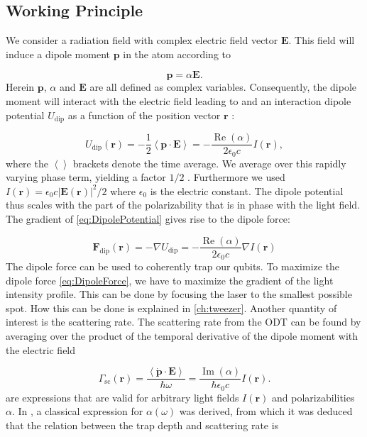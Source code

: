 \subsection{Working Principle}

We consider a radiation field with complex electric field vector $\mathbf{E}$. 
This field will induce a dipole moment $\mathbf{p}$ in the atom according to 
	
\begin{equation}\label{eq:DipoleMoment}
	\mathbf{p} = \alpha \mathbf{E}.
\end{equation}
Herein $\mathbf{p}$, $\alpha$ and $\mathbf{E}$ are all defined as complex variables. Consequently, the dipole moment will interact with the electric field leading to and an interaction dipole potential $U_{\text{dip}}$ as a function of the position vector $\mathbf{r}$ \cite{Grimm2000}:

\begin{equation}\label{eq:DipolePotential}
	U_{\text{dip}}(\mathbf{r}) = 
	-\frac{1}{2} \left\langle \mathbf{p}\cdot\mathbf{E} \right\rangle=
	- \frac{\operatorname{Re}(\alpha)}{2\epsilon_0 c} I(\mathbf{r}),
\end{equation}
where the $\left\langle\right\rangle$ brackets denote the time average.
We average over this rapidly varying phase term, yielding a factor $1/2$ \cite{Grimm2000}.
Furthermore we used $I(\mathbf{r}) = \epsilon_0 c |\mathbf{E}(\mathbf{r})|^2/2$ where $\epsilon_0$ is the electric constant. 
The dipole potential thus scales with the part of the polarizability that is in phase with the light field.
The gradient of \cref{eq:DipolePotential} gives rise to the dipole force:

\begin{equation}\label{eq:DipoleForce}
	\mathbf{F}_{\text{dip}}(\mathbf{r}) 
	= - \nabla U_{\text{dip}}
	= - \frac{\operatorname{Re}(\alpha)}{2\epsilon_0c}\nabla I(\mathbf{r})
\end{equation}
The dipole force can be used to coherently trap our qubits. 
To maximize the dipole force \cref{eq:DipoleForce}, 
we have to maximize the gradient of the light intensity profile.
This can be done by focusing the laser to the smallest possible spot.
How this can be done is explained in \cref{ch:tweezer}. 
Another quantity of interest is the scattering rate.
The scattering rate from the ODT can be found by averaging over the product of the temporal derivative of the dipole moment with the electric field \cite{Grimm2000}

\begin{equation}\label{eq:ScatteringRate}
	\Gamma_{\text{sc}}(\mathbf{r}) = \frac{\left\langle \mathbf{\dot{p}} \cdot \mathbf{E} \right\rangle}{\hbar \omega}
	 = \frac{\operatorname{Im}(\alpha)}{\hbar \epsilon_0 c} I(\mathbf{r}).
\end{equation}
 are expressions that are valid for arbitrary light fields $I(\mathbf{r})$ and polarizabilities $\alpha$.
In \cite{Grimm2000}, a classical expression for $\alpha(\omega)$ was derived, from which it was deduced that the relation between the trap depth and scattering rate is

